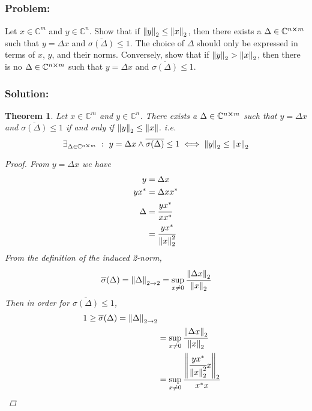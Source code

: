 \documentclass[letter]{article}
\numberwithin{equation}{section}
\newcommand{\C}{\mathbb{C}}
\newcommand{\st}{\ : \ }
\newtheorem{theorem}{Theorem}
\begin{document}
\subsection{}
\subsubsection*{Problem:}
Let $x\in \C^m$ and $y \in \C^n$.
Show that if $\norm{y}_2 \leq \norm{x}_2$, then there exists a $\Delta \in \C^{n\cross m}$ such that $y = \Delta x$ and $\overline{\sigma(\Delta)}\leq 1$.
The choice of $\Delta$ should only be expressed in terms of $x$, $y$, and their norms.
Conversely, show that if $\norm{y}_2 > \norm{x}_2$, then there is no $\Delta \in \C^{n\cross m}$ such that $y = \Delta x$ and $\overline{\sigma(\Delta)}\leq 1$.

\subsubsection*{Solution:}
\begin{theorem}
    Let $x \in \C^m$ and $y \in \C^n$.
    There exists a $\Delta \in \C^{n\cross m}$ such that $y = \Delta x$ and $\overline{\sigma(\Delta)}\leq 1$ if and only if $\norm{y}_2 \leq \norm{x}$.
    i.e.\[
        \exists_{\Delta \in \C^{n\cross m}} \st y = \Delta x \land \overline{\sigma(\Delta)}\leq 1
        \iff \norm{y}_2 \leq \norm{x}_2
    \]
    \begin{proof}
        From $y = \Delta x$ we have \begin{align*}
            y &= \Delta x\\
            y x^* &= \Delta x x^*\\
            \Delta 
                &= \cfrac{y x^*}{x x^*}\\
                &= \cfrac{y x^*}{\norm{x}_2^2}
        \end{align*}
        From the definition of the induced 2-norm,\[
            \overline{\sigma}(\Delta) = \norm{\Delta}_{2\to2} 
                = \sup_{x \neq 0} \cfrac{\norm{\Delta x}_2}{\norm{x}_2}
        \] Then in order for $\overline{\sigma(\Delta)}\leq 1$, \begin{align*}
            1 \geq \overline{\sigma}(\Delta) 
                = \norm{\Delta}_{2\to2}\\
                &= \sup_{x \neq 0} \cfrac{\norm{\Delta x}_2}{\norm{x}_2}\\
                &= \sup_{x \neq 0} \cfrac{\norm{\cfrac{y x^*}{\norm{x}_2^2} x}_2}{x^* x}\\
        \end{align*}
    \end{proof}
\end{theorem}
\end{document}
